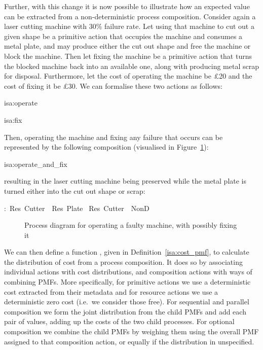 \documentclass[class=smolathesis,crop=false]{standalone}
\begin{document}
Further, with this change it is now possible to illustrate how an expected value can be extracted from a non-deterministic process composition.
Consider again a laser cutting machine with 30\% failure rate.
Let using that machine to cut out a given shape be a primitive action that occupies the machine and consumes a metal plate, and may produce either the cut out shape and free the machine or block the machine.
Then let fixing the machine be a primitive action that turns the blocked machine back into an available one, along with producing metal scrap for disposal.
Furthermore, let the cost of operating the machine be \pounds20 and the cost of fixing it be \pounds30.
We can formalise these two actions as follows:
\begin{isadef}{isa:operate}
  
\end{isadef}
\pagebreak
\begin{isadef}{isa:fix}
  
\end{isadef}

Then, operating the machine and fixing any failure that occurs can be represented by the following composition (visualised in Figure~\ref{fig:operate_and_fix}):
\begin{isadef}{isa:operate_and_fix}
  
\end{isadef}
resulting in the laser cutting machine being preserved while the metal plate is turned either into the cut out shape or scrap:
\begin{isabelle}
\centering
  :\ Res\ Cutter\ \isasymodot\ Res\ Plate\ \isasymrightarrow\isanewline
  Res\ Cutter\ \isasymodot\ NonD\ \ \ 
\end{isabelle}

\begin{figure}[htbp]
  
  \caption{Process diagram for operating a faulty machine, with possibly fixing it}
  \label{fig:operate_and_fix}
\end{figure}

\cbstart
We can then define a function , given in Definition~\ref{isa:cost_pmf}, to calculate the distribution of cost from a process composition.
It does so by associating individual actions with cost distributions, and composition actions with ways of combining PMFs.
More specifically, for primitive actions we use a deterministic cost extracted from their metadata and for resource actions we use a deterministic zero cost (i.e.\ we consider those free).
For sequential and parallel composition we form the joint distribution from the child PMFs and add each pair of values, adding up the costs of the two child processes.
For optional composition we combine the child PMFs by weighing them using the overall PMF assigned to that composition action, or equally if the distribution in unspecified.
\cbend
\end{document}
